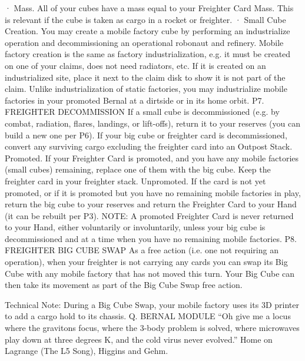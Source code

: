 \documentclass[a4paper]{book}
\begin{document}
·       Mass. All of your cubes have a mass equal to your Freighter Card Mass. This is relevant if the cube is taken as cargo in a rocket or freighter.
·   	Small Cube Creation. You may create a mobile factory cube by performing an industrialize operation and decommissioning an operational robonaut and refinery. Mobile factory creation is the same as factory industrialization, e.g. it must be created on one of your claims, does not need radiators, etc. If it is created on an industrialized site, place it next to the claim disk to show it is not part of the claim. Unlike industrialization of static factories, you may industrialize mobile factories in your promoted Bernal at a dirtside or in its home orbit.
P7. FREIGHTER DECOMMISSION
If a small cube is decommissioned (e.g. by combat, radiation, flares, landings, or lift-offs), return it to your reserves (you can build a new one per P6). If your big cube or freighter card is decommissioned, convert any surviving cargo excluding the freighter card into an Outpost Stack. 
Promoted. If your Freighter Card is promoted, and you have any mobile factories (small cubes) remaining, replace one of them with the big cube. Keep the freighter card in your freighter stack.
Unpromoted. If the card is not yet promoted, or if it is promoted but you have no remaining mobile factories in play, return the big cube to your reserves and return the Freighter Card to your Hand (it can be rebuilt per P3).
NOTE: A promoted Freighter Card is never returned to your Hand, either voluntarily or involuntarily, unless your big cube is decommissioned and at a time when you have no remaining mobile factories.
P8. FREIGHTER BIG CUBE SWAP
As a free action (i.e. one not requiring an operation), when your freighter is not carrying any cards you can swap its Big Cube with any mobile factory that has not moved this turn. Your Big Cube can then take its movement as part of the Big Cube Swap free action.

Technical Note: During a Big Cube Swap, your mobile factory uses its 3D printer to add a cargo hold to its chassis.
Q. BERNAL MODULE
“Oh give me a locus where the gravitons focus, where the 3-body problem is solved, where microwaves play down at three degrees K, and the cold virus never evolved.” Home on Lagrange (The L5 Song), Higgins and Gehm.
\end{document}
